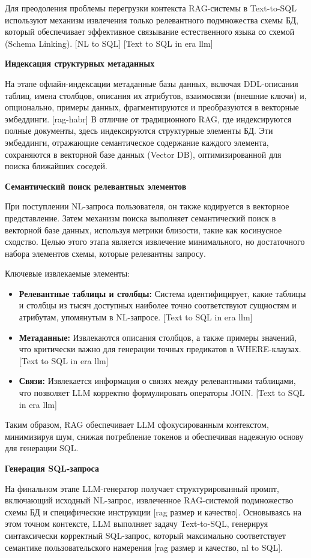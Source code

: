 Для преодоления проблемы перегрузки контекста RAG-системы в Text-to-SQL используют механизм извлечения только релевантного подмножества схемы БД, который обеспечивает эффективное связывание естественного языка со схемой (Schema Linking). [NL to SQL] [Text to SQL in era llm]

\textbf{Индексация структурных метаданных}

На этапе офлайн-индексации метаданные базы данных, включая DDL-описания таблиц, имена столбцов, описания их атрибутов, взаимосвязи (внешние ключи) и, опционально, примеры данных, фрагментируются и преобразуются в векторные эмбеддинги. [rag-habr] В отличие от традиционного RAG, где индексируются полные документы, здесь индексируются структурные элементы БД. Эти эмбеддинги, отражающие семантическое содержание каждого элемента, сохраняются в векторной базе данных (Vector DB), оптимизированной для поиска ближайших соседей. 

\textbf{Семантический поиск релевантных элементов}

При поступлении NL-запроса пользователя, он также кодируется в векторное представление. Затем механизм поиска выполняет семантический поиск в векторной базе данных, используя метрики близости, такие как косинусное сходство.
Целью этого этапа является извлечение минимального, но достаточного набора элементов схемы, которые релевантны запросу. 

Ключевые извлекаемые элементы:

\begin{itemize}
    \item \textbf{Релевантные таблицы и столбцы:} Система идентифицирует, какие таблицы и столбцы из тысяч доступных наиболее точно соответствуют сущностям и атрибутам, упомянутым в NL-запросе. [Text to SQL in era llm]
    \item \textbf{Метаданные:} Извлекаются описания столбцов, а также примеры значений, что критически важно для генерации точных предикатов в WHERE-клаузах. [Text to SQL in era llm]
    \item \textbf{Связи:} Извлекается информация о связях между релевантными таблицами, что позволяет LLM корректно формулировать операторы JOIN. [Text to SQL in era llm]
\end{itemize}

Таким образом, RAG обеспечивает LLM сфокусированным контекстом, минимизируя шум, снижая потребление токенов и обеспечивая надежную основу для генерации SQL.

\textbf{Генерация SQL-запроса}

На финальном этапе LLM-генератор получает структурированный промпт, включающий исходный NL-запрос, извлеченное RAG-системой подмножество схемы БД и специфические инструкции [rag размер и качество]. Основываясь на этом точном контексте, LLM выполняет задачу Text-to-SQL, генерируя синтаксически корректный SQL-запрос, который максимально соответствует семантике пользовательского намерения [rag размер и качество, nl to SQL].
